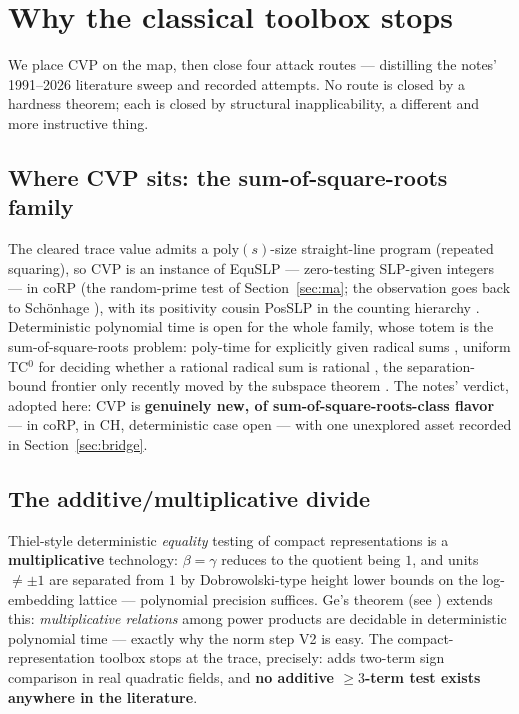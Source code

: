 \documentclass[11pt]{amsart}
\theoremstyle{plain}
\theoremstyle{remark}
\begin{document}
\section{Why the classical toolbox stops}\label{sec:toolbox}

We place CVP on the map, then close four attack routes --- distilling
the notes' 1991--2026 literature sweep and recorded attempts. No
route is closed by a hardness theorem; each is closed by structural
inapplicability, a different and more instructive thing.

\setcounter{subsection}{-1}%

\subsection{Where CVP sits: the sum-of-square-roots family}
\label{sec:family}

The cleared trace value admits a $\mathrm{poly}(s)$-size
straight-line program (repeated squaring), so CVP is an instance of
EquSLP --- zero-testing SLP-given integers --- in coRP (the
random-prime test of Section~\ref{sec:ma}; the observation goes back
to Sch\"onhage \cite{Sch79}), with its positivity cousin PosSLP in
the counting hierarchy \cite{ABKM09,ESY14}. Deterministic polynomial
time is open for the whole family, whose totem is the
sum-of-square-roots problem: poly-time for explicitly given radical
sums \cite{Blo91}, uniform TC$^0$ for deciding whether a rational
radical sum is rational \cite{HBMOW10}, the separation-bound frontier
only recently moved by the subspace theorem \cite{EHS24}. The notes'
verdict, adopted here: CVP is \textbf{genuinely new, of
sum-of-square-roots-class flavor} --- in coRP, in CH, deterministic
case open --- with one unexplored asset recorded in
Section~\ref{sec:bridge}.

\subsection{The additive/multiplicative divide}\label{sec:divide}

Thiel-style deterministic \emph{equality} testing of compact
representations is a \textbf{multiplicative} technology:
$\beta = \gamma$ reduces to the quotient being $1$, and units
$\ne \pm1$ are separated from $1$ by Dobrowolski-type height lower
bounds \cite{Dob79} on the log-embedding lattice --- polynomial
precision suffices. Ge's theorem \cite{Ge93} (see
\cite[Thm.~165]{vG25}) extends this: \emph{multiplicative relations}
among power products are decidable in deterministic polynomial time
--- exactly why the norm step V2 is easy. The compact-representation
toolbox stops at the trace, precisely: \cite{BTW95} adds two-term
sign comparison in real quadratic fields, and \textbf{no additive
$\ge 3$-term test exists anywhere in the literature}.
\end{document}

